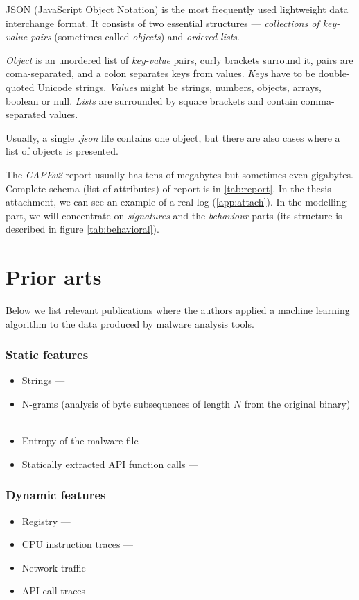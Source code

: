 JSON (JavaScript Object Notation) is the most frequently used lightweight data interchange format. It consists of two essential structures ---  \emph{collections of key-value pairs} (sometimes called \emph{objects}) and \emph{ordered lists}. 

\emph{Object} is an unordered list of \emph{key-value} pairs, curly brackets surround it, pairs are coma-separated, and a colon separates keys from values. \emph{Keys} have to be double-quoted Unicode strings. \emph{Values} might be strings, numbers, objects, arrays, boolean or null. \emph{Lists} are surrounded by square brackets and contain comma-separated values.

Usually, a single \emph{.json} file contains one object, but there are also cases where a list of objects is presented.

The \emph{CAPEv2} report usually has tens of megabytes but sometimes even gigabytes. Complete schema (list of attributes) of report is in \ref{tab:report}. In the thesis attachment, we can see an example of a real log (\ref{app:attach}). In the modelling part, we will concentrate on \emph{signatures} and the \emph{behaviour} parts (its structure is described in figure \ref{tab:behavioral}).


\section{Prior arts}
Below we list relevant publications where the authors applied a machine learning algorithm to the data produced by malware analysis tools.
\subsubsection*{Static features}
\begin{itemize}
  \itemsep0em 
  \item Strings ---  \cite{Lee2011}
  \item N-grams (analysis of byte subsequences of length $N$ from the original binary) ---  \cite{Fuyong2017}
  \item Entropy of the malware file ---  \cite{Wojnowicz2018}
  \item Statically extracted API function calls ---  \cite{Ahmadi2016}
\end{itemize}

\subsubsection*{Dynamic features}
\begin{itemize}
  \itemsep0em 
  \item Registry ---  \cite{Ghiasi2015}
  \item CPU instruction traces ---  \cite{Carlin2017}
  \item Network traffic ---  \cite{Boukhtouta2015}
  \item API call traces ---   \cite{Galal2015}
\end{itemize}

